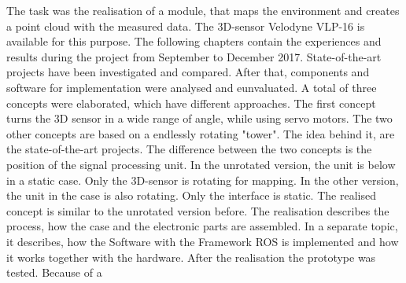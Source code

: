 The task was the
realisation of a module, that maps the environment and creates a point cloud with the
measured data. The 3D-sensor Velodyne VLP-16 is available for this purpose.
The following chapters contain the experiences and results during the project from September
to December 2017. State-of-the-art projects have been investigated and compared.
After that, components and software for implementation were analysed and eunvaluated.
A total of three concepts were elaborated, which have different approaches. The first
concept turns the 3D sensor in a wide range of angle, while using servo motors. The
two other concepts are based on a endlessly rotating "tower". The idea behind it, are the
state-of-the-art projects. The difference between the two concepts is the position of the
signal processing unit. In the unrotated version, the unit is below in a static case. Only
the 3D-sensor is rotating for mapping. In the other version, the unit in the case is also
rotating. Only the interface is static.
The realised concept is similar to the unrotated version before. The realisation describes
the process, how the case and the electronic parts are assembled. In a separate topic, it
describes, how the Software with the Framework ROS is implemented and how it works
together with the hardware.
After the realisation the prototype was tested. Because of a
